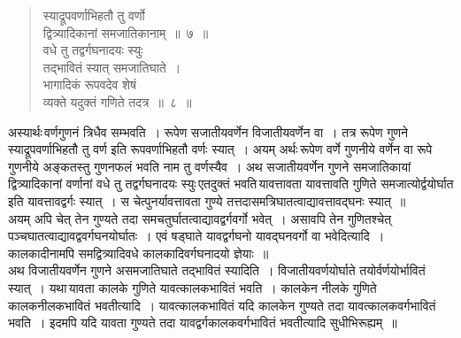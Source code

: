 \documentclass[11pt, openany]{book}
\begin{document}
 \label{1.8}
\begin{quote}
    \bs
    स्याद्रूपवर्णाभिहतौ तु वर्णो \\

\vspace{-7mm}
\hspace{1cm} द्वित्र्यादिकानां समजातिकानाम्~॥~७~॥\\

 \vspace{-5mm}
 वधे तु तद्वर्गघनादयः स्युः\\

\vspace{-7mm}
\hspace{1cm} तद्भावितं स्यात् समजातिघाते~। \\

 \vspace{-7mm}
 भागादिकं रूपवदेव शेषं \\

\vspace{-7mm}
\hspace{1cm} व्यक्ते यदुक्तं गणिते तदत्र~॥~८~॥
\end{quote}

 अस्यार्थः\textendash \,वर्णगुणनं त्रिधैव सम्भवति~। रूपेण सजातीयवर्णेन विजातीयवर्णेन वा~। तत्र रूपेण गुणने स्याद्रूपवर्णाभिहतौ तु वर्ण इति
रूपवर्णाभिहतौ वर्णः स्यात्~। अयम् अर्थः\textendash \,रूपेण वर्णे गुणनीये वर्णेन वा रूपे गुणनीये अङ्कतस्तु गुणनफलं भवति नाम तु वर्णस्यैव~। अथ सजातीयवर्णेन गुणने समजातिकायां द्वित्र्यादिकानां वर्णानां वधे तु तद्वर्गघनादयः
स्युः\textendash \,एतदुक्तं भवति\textendash \,यावत्तावता यावत्तावति गुणिते समजात्योर्द्वयोर्घात इति यावत्तावद्वर्गः स्यात्~। स चेत्पुनर्यावत्तावता गुण्ये
तत्तदासमत्रिघातत्वाद्यावत्तावद्घनः स्यात्~॥ \\

\vspace{-3mm}
 अयम् अपि चेत् तेन गुण्यते तदा समचतुर्घातत्वाद्यावद्वर्गवर्गो भवेत्~। 
असावपि तेन गुणितश्चेत् पञ्चघातत्वाद्यावद्ववर्गघनयोर्घातः~। एवं षड्घाते 
यावद्वर्गघनो यावद्घनवर्गो वा भवेदित्यादि~। कालकादीनामपि समद्वित्र्यादिवधे कालकादिवर्गघनादयो ज्ञेयाः~॥\\

\vspace{-3mm}
 अथ विजातीयवर्णेन गुणने असमजातिघाते तद्भावितं स्यादिति~। 
विजातीयवर्णयोर्घाते तयोर्वर्णयोर्भावितं स्यात्~। यथा\textendash \,यावता कालके 
गुणिते यावत्कालकभावितं भवति~। कालकेन नीलके गुणिते कालकनीलकभावितं भवतीत्यादि~। यावत्कालकभावितं यदि कालकेन गुण्यते 
तदा यावत्कालकवर्गभावितं भवति~। इदमपि यदि यावता गुण्यते तदा 
यावद्वर्गकालकवर्गभावितं भवतीत्यादि सुधीभिरूह्यम्~॥
\end{document}
